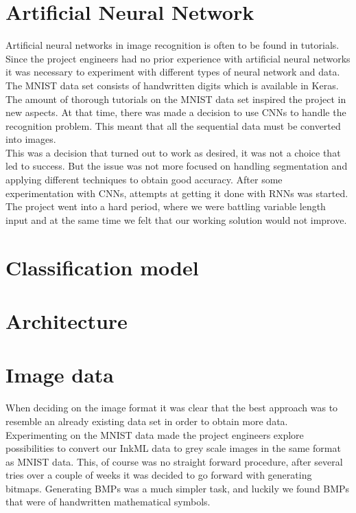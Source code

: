 \section{Artificial Neural Network}
Artificial neural networks in image recognition is often to be found in tutorials. Since the project engineers had no prior experience with artificial neural networks it was necessary to experiment with different types of neural network and data. The MNIST data set consists of handwritten digits which is available in Keras. The amount of thorough tutorials on the MNIST data set inspired the project in new aspects. At that time, there was made a decision to use CNNs to handle the recognition problem. This meant that all the sequential data must be converted into images. \\ This was a decision that turned out to work as desired, it was not a choice that led to success. But the issue was not more focused on handling segmentation and applying different techniques to obtain good accuracy. After some experimentation with CNNs, attempts at getting it done with RNNs was started. The project went into a hard period, where we were battling variable length input and at the same time we felt that our working solution would not improve. %

\section{Classification model}


\section{Architecture}



\section{Image data}
When deciding on the image format it was clear that the best approach was to resemble an already existing data set in order to obtain more data. Experimenting on the MNIST data made the project engineers explore possibilities to convert our InkML data to grey scale images in the same format as MNIST data. This, of course was no straight forward procedure, after several tries over a couple of weeks it was decided to go forward with generating bitmaps. Generating BMPs was a much simpler task, and luckily we found BMPs that were of handwritten mathematical symbols.


